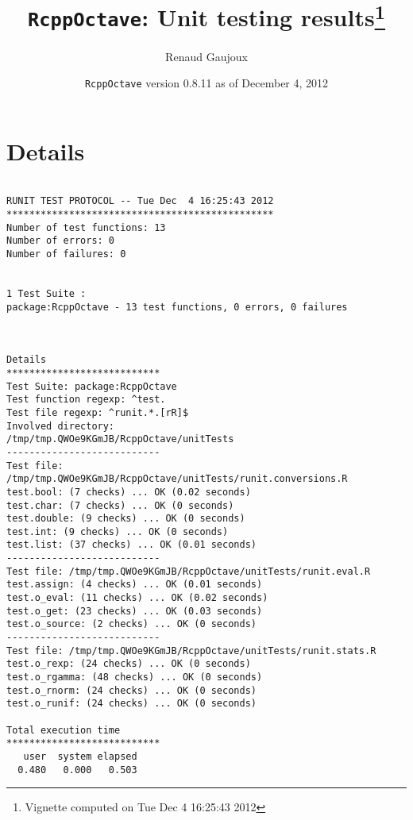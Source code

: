 \documentclass[10pt]{article}
\author{Renaud Gaujoux}
\title{\texttt{RcppOctave}: Unit testing results\footnote{Vignette computed  on Tue Dec  4 16:25:43 2012}}
\date{\texttt{RcppOctave} version 0.8.11 as of December  4, 2012}
\begin{document}
\maketitle

\section{Details}
\begin{verbatim}

RUNIT TEST PROTOCOL -- Tue Dec  4 16:25:43 2012 
*********************************************** 
Number of test functions: 13 
Number of errors: 0 
Number of failures: 0 

 
1 Test Suite : 
package:RcppOctave - 13 test functions, 0 errors, 0 failures



Details 
*************************** 
Test Suite: package:RcppOctave 
Test function regexp: ^test. 
Test file regexp: ^runit.*.[rR]$ 
Involved directory: 
/tmp/tmp.QWOe9KGmJB/RcppOctave/unitTests 
--------------------------- 
Test file: /tmp/tmp.QWOe9KGmJB/RcppOctave/unitTests/runit.conversions.R 
test.bool: (7 checks) ... OK (0.02 seconds)
test.char: (7 checks) ... OK (0 seconds)
test.double: (9 checks) ... OK (0 seconds)
test.int: (9 checks) ... OK (0 seconds)
test.list: (37 checks) ... OK (0.01 seconds)
--------------------------- 
Test file: /tmp/tmp.QWOe9KGmJB/RcppOctave/unitTests/runit.eval.R 
test.assign: (4 checks) ... OK (0.01 seconds)
test.o_eval: (11 checks) ... OK (0.02 seconds)
test.o_get: (23 checks) ... OK (0.03 seconds)
test.o_source: (2 checks) ... OK (0 seconds)
--------------------------- 
Test file: /tmp/tmp.QWOe9KGmJB/RcppOctave/unitTests/runit.stats.R 
test.o_rexp: (24 checks) ... OK (0 seconds)
test.o_rgamma: (48 checks) ... OK (0 seconds)
test.o_rnorm: (24 checks) ... OK (0 seconds)
test.o_runif: (24 checks) ... OK (0 seconds)

Total execution time
***************************
   user  system elapsed 
  0.480   0.000   0.503 

\end{verbatim}
\end{document}
